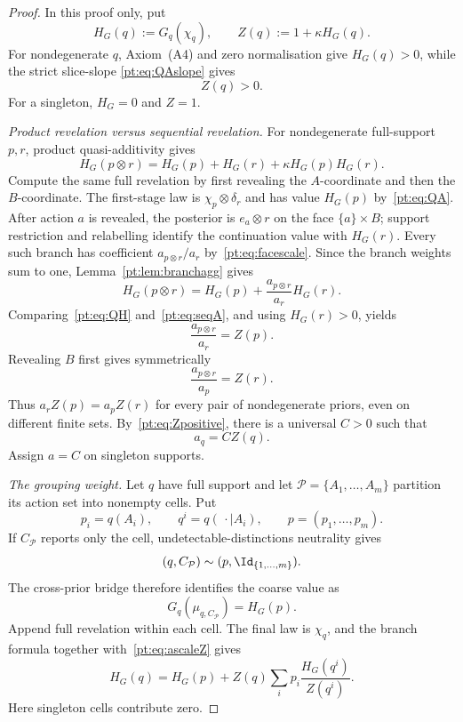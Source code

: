 \begin{proof}
In this proof only, put
\[
 H_G(q):=G_q(\chi_q),\qquad Z(q):=1+\kappa H_G(q).
\]
For nondegenerate $q$, Axiom~\textup{(A4)} and zero normalisation give
$H_G(q)>0$, while the strict slice-slope
\eqref{pt:eq:QAslope} gives
\begin{equation}
 Z(q)>0.
\label{pt:eq:Zpositive}
\end{equation}
For a singleton, $H_G=0$ and $Z=1$.

\emph{Product revelation versus sequential revelation.}
For nondegenerate full-support $p,r$, product quasi-additivity gives
\begin{equation}
 H_G(p\otimes r)
 =H_G(p)+H_G(r)+\kappa H_G(p)H_G(r).
\tag{QH}\label{pt:eq:QH}
\end{equation}
Compute the same full revelation by first revealing the $A$-coordinate and
then the $B$-coordinate.  The first-stage law is
$\chi_p\otimes\delta_r$ and has value $H_G(p)$ by~\eqref{pt:eq:QA}.
After action $a$ is revealed, the posterior is $e_a\otimes r$ on the face
$\{a\}\times B$; support restriction and relabelling identify the
continuation value with $H_G(r)$.  Every such branch has coefficient
$a_{p\otimes r}/a_r$ by~\eqref{pt:eq:facescale}.  Since the branch weights
sum to one, Lemma~\ref{pt:lem:branchagg} gives
\begin{equation}
 H_G(p\otimes r)=H_G(p)+\frac{a_{p\otimes r}}{a_r}H_G(r).
\tag{SA}\label{pt:eq:seqA}
\end{equation}
Comparing~\eqref{pt:eq:QH} and~\eqref{pt:eq:seqA}, and using
$H_G(r)>0$, yields
\[
 \frac{a_{p\otimes r}}{a_r}=Z(p).
\tag{R1}\label{pt:eq:ratio1}
\]
Revealing $B$ first gives symmetrically
\[
 \frac{a_{p\otimes r}}{a_p}=Z(r).
\tag{R2}\label{pt:eq:ratio2}
\]
Thus $a_rZ(p)=a_pZ(r)$ for every pair of nondegenerate priors, even on
different finite sets.  By~\eqref{pt:eq:Zpositive}, there is a universal
$C>0$ such that
\begin{equation}
 a_q=CZ(q).
\tag{AS}\label{pt:eq:ascaleZ}
\end{equation}
Assign $a=C$ on singleton supports.

\emph{The grouping weight.}
Let $q$ have full support and let
$\mathcal P=\{A_1,\ldots,A_m\}$ partition its action set into nonempty
cells.  Put
\[
 p_i=q(A_i),\qquad q^i=q(\,\cdot\mid A_i),\qquad
 p=(p_1,\ldots,p_m).
\]
If $C_{\mathcal P}$ reports only the cell, undetectable-distinctions
neutrality gives
\[
 (q,C_{\mathcal P})\sim(p,\Id_{\{1,\ldots,m\}}).
\]
The cross-prior bridge therefore identifies the coarse value as
\begin{equation}
 G_q(\mu_{q,C_{\mathcal P}})=H_G(p).
\tag{BG}\label{pt:eq:blockvalue}
\end{equation}
Append full revelation within each cell.  The final law is $\chi_q$, and the
branch formula together with~\eqref{pt:eq:ascaleZ} gives
\begin{equation}
 H_G(q)=H_G(p)+Z(q)\sum_i p_i\frac{H_G(q^i)}{Z(q^i)}.
\tag{GR}\label{pt:eq:groupingH}
\end{equation}
Here singleton cells contribute zero.


\end{proof}

